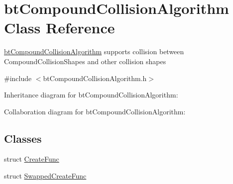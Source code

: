 \hypertarget{classbt_compound_collision_algorithm}{\section{bt\+Compound\+Collision\+Algorithm Class Reference}
\label{classbt_compound_collision_algorithm}
}


\hyperlink{classbt_compound_collision_algorithm}{bt\+Compound\+Collision\+Algorithm} supports collision between Compound\+Collision\+Shapes and other collision shapes  




{\ttfamily \#include $<$bt\+Compound\+Collision\+Algorithm.\+h$>$}



Inheritance diagram for bt\+Compound\+Collision\+Algorithm\+:


Collaboration diagram for bt\+Compound\+Collision\+Algorithm\+:
\subsection*{Classes}
\begin{DoxyCompactItemize}
\item 
struct \hyperlink{structbt_compound_collision_algorithm_1_1_create_func}{Create\+Func}
\item 
struct \hyperlink{structbt_compound_collision_algorithm_1_1_swapped_create_func}{Swapped\+Create\+Func}
\end{DoxyCompactItemize}
